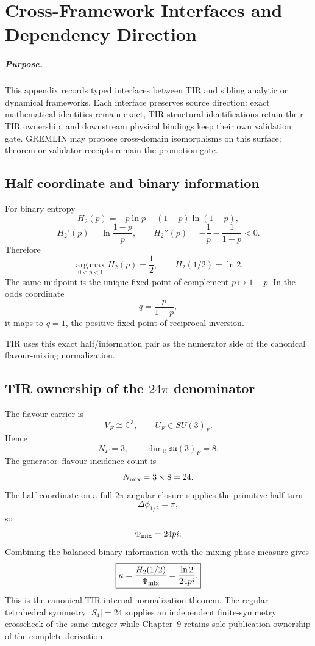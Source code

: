 \chapter{Cross-Framework Interfaces and Dependency Direction}
\label{app:v12_cross_framework}

\paragraph{Purpose.}
This appendix records typed interfaces between TIR and sibling analytic or
dynamical frameworks.  Each interface preserves source direction: exact
mathematical identities remain exact, TIR structural identifications retain
their TIR ownership, and downstream physical bindings keep their own validation
gate.  GREMLIN may propose cross-domain isomorphisms on this surface; theorem or
validator receipts remain the promotion gate.

\section{Half coordinate and binary information}

For binary entropy
\[
H_2(p)=-p\ln p-(1-p)\ln(1-p),
\]
\[
H_2'(p)=\ln\frac{1-p}{p},
\qquad
H_2''(p)=-\frac1p-\frac1{1-p}<0.
\]
Therefore
\[
\boxed{
\operatorname*{arg\,max}_{0<p<1}H_2(p)=\frac12,
\qquad
H_2(1/2)=\ln2.
}
\]
The same midpoint is the unique fixed point of complement \(p\mapsto1-p\).
In the odds coordinate
\[
q=\frac{p}{1-p},
\]
it maps to \(q=1\), the positive fixed point of reciprocal inversion.

TIR uses this exact half/information pair as the numerator side of the canonical
flavour-mixing normalization.

\section{TIR ownership of the \(24\pi\) denominator}

The flavour carrier is
\[
V_F\cong\mathbb C^3,
\qquad
U_F\in SU(3)_F.
\]
Hence
\[
N_F=3,\qquad
\dim_{\mathbb R}\mathfrak{su}(3)_F=8.
\]
The generator--flavour incidence count is
\[
N_{\rm mix}=3\times8=24.
\]
The half coordinate on a full \(2\pi\) angular closure supplies the primitive
half-turn
\[
\Delta\phi_{1/2}=\pi,
\]
so
\[
\Phi_{\rm mix}=24\pi.
\]
Combining the balanced binary information with the mixing-phase measure gives
\[
\boxed{
\kappa
=\frac{H_2(1/2)}{\Phi_{\rm mix}}
=\frac{\ln2}{24\pi}.
}
\]
This is the canonical TIR-internal normalization theorem.  The regular
tetrahedral symmetry \(|S_4|=24\) supplies an independent finite-symmetry
crosscheck of the same integer while Chapter~9 retains sole publication
ownership of the complete derivation.


